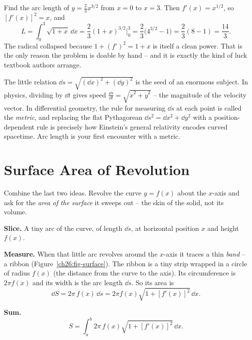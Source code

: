 \begin{example}
\label{ch26:ex-arclen}
Find the arc length of $y = \tfrac{2}{3}x^{3/2}$ from $x=0$ to $x=3$. Then
$f'(x) = x^{1/2}$, so $[f'(x)]^2 = x$, and
\[
  L = \int_0^3 \sqrt{1+x}\,\dd x
    = \frac{2}{3}(1+x)^{3/2}\Big|_0^3
    = \frac{2}{3}\bigl(4^{3/2} - 1\bigr)
    = \frac{2}{3}(8-1) = \frac{14}{3}.
\]
The radical collapsed because $1+(f')^2 = 1+x$ is itself a clean power. That is the
only reason the problem is doable by hand -- and it is exactly the kind of luck
textbook authors arrange.
\end{example}

\begin{connectionbox}
The little relation $\dd s = \sqrt{(\dd x)^2 + (\dd y)^2}$ is the seed of an
enormous subject. In physics, dividing by $\dd t$ gives speed
$\frac{\dd s}{\dd t} = \sqrt{\dot x^2 + \dot y^2}$ -- the magnitude of the velocity
vector. In differential geometry, the rule for measuring $\dd s$ at each point is
called the \emph{metric}, and replacing the flat Pythagorean $\dd s^2 = \dd x^2 +
\dd y^2$ with a position-dependent rule is precisely how Einstein's general
relativity encodes curved spacetime. Arc length is your first encounter with a
metric.
\end{connectionbox}

\section{Surface Area of Revolution}
\label{ch26:surface}

Combine the last two ideas. Revolve the curve $y=f(x)$ about the $x$-axis and ask
for the \emph{area of the surface} it sweeps out -- the skin of the solid, not its
volume.

\textbf{Slice.} A tiny arc of the curve, of length $\dd s$, at horizontal position
$x$ and height $f(x)$.

\textbf{Measure.} When that little arc revolves around the $x$-axis it traces a
thin \emph{band} -- a ribbon (Figure~\ref{ch26:fig-surface}). The ribbon is a tiny
strip wrapped in a circle of radius $f(x)$ (the distance from the curve to the
axis). Its circumference is
$2\pi f(x)$ and its width is the arc length $\dd s$. So its area is
\[
  \dd S = 2\pi\,f(x)\,\dd s = 2\pi f(x)\sqrt{1+[f'(x)]^2}\,\dd x.
\]

\textbf{Sum.}
\[
  \boxed{\,S = \int_a^b 2\pi\,f(x)\sqrt{1+[f'(x)]^2}\,\dd x.\,}
\]

